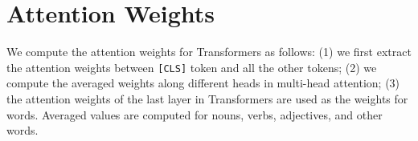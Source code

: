 \documentclass[11pt]{article}
\begin{document}
\section{Attention Weights}
\label{app:attention}
We compute the attention weights for Transformers as follows:
(1) we first extract the attention weights between \texttt{[CLS]} token and all the other tokens;
(2) we compute the averaged weights along different heads in multi-head attention;
(3) the attention weights of the last layer in Transformers are used as the weights for words.
Averaged values are computed for nouns, verbs, adjectives, and other words.
\end{document}
